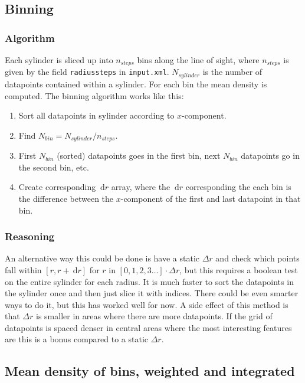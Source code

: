 \documentclass[a4paper, 12pt, english, titlepage]{article}
\newcommand{\D}[1]{\ \mathrm{d}#1} %
\begin{document}
\subsection{Binning}

    \subsubsection{Algorithm}
        Each sylinder is sliced up into $n_{steps}$ bins along the line of sight, where $n_{steps}$ is given by the field \texttt{radiussteps} in \texttt{input.xml}. $N_{sylinder}$ is the number of datapoints contained within a sylinder. For each bin the mean density is computed. The binning algorithm works like this:
        \begin{enumerate}
            \item Sort all datapoints in sylinder according to $x$-component.
            \item Find $N_{bin} = N_{sylinder} / n_{steps}$.
            \item First $N_{bin}$ (sorted) datapoints goes in the first bin, next $N_{bin}$ datapoints go in the second bin, etc.
            \item Create corresponding $\D r$ array, where the $\D r$ corresponding the each bin is the difference between the $x$-component of the first and last datapoint in that bin.
        \end{enumerate}

    \subsubsection{Reasoning}
        An alternative way this could be done is have a static $\Delta r$ and check which points fall within $[r, r + \D r]$ for $r$ in $[0, 1, 2, 3 \hdots]\cdot\Delta r$, but this requires a boolean test on the entire sylinder for each radius. It is much faster to sort the datapoints in the sylinder once and then just slice it with indices. There could be even smarter ways to do it, but this has worked well for now. A side effect of this method is that $\Delta r$ is smaller in areas where there are more datapoints. If the grid of datapoints is spaced denser in central areas where the most interesting features are this is a bonus compared to a static $\Delta r$.


\subsection{Mean density of bins, weighted and integrated}
    \label{sec:bin_densities}
\end{document}
